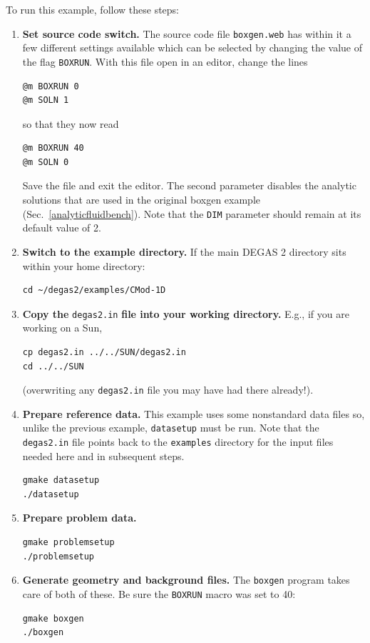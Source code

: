 \documentclass[12pt]{report}
\begin{document}
To run this example, follow these steps:
\begin{enumerate}
  \item {\bf Set source code switch.} The source code file {\tt boxgen.web}
has within it a few different settings available which can be selected
by changing the value of the flag {\tt BOXRUN}. With this file open in
an editor, change the lines
\begin{verbatim}
@m BOXRUN 0
@m SOLN 1
\end{verbatim}
so that they now read
\begin{verbatim}
@m BOXRUN 40
@m SOLN 0
\end{verbatim}
Save the file and exit the editor. The second parameter disables the
analytic solutions that are used in the original boxgen
example (Sec.~\ref{analyticfluidbench}).  Note that the 
\verb+DIM+ parameter should remain at its default value of
2.
  \item {\bf Switch to the example directory.} If the main DEGAS 2 
directory sits within your home directory:
\begin{verbatim}
cd ~/degas2/examples/CMod-1D
\end{verbatim}
  \item {\bf Copy the} {\tt degas2.in} {\bf file into your working
directory.} E.g., if you are working on a Sun, 
\begin{verbatim}
cp degas2.in ../../SUN/degas2.in
cd ../../SUN
\end{verbatim}
(overwriting any {\tt degas2.in} file you may have had there already!).
  \item {\bf Prepare reference data.} This example uses some nonstandard
data files so, unlike the previous example, {\tt datasetup}
must be run. Note that the {\tt degas2.in} file points back to
the {\tt examples} directory for the input files needed here and in 
subsequent steps.
\begin{verbatim}
gmake datasetup
./datasetup
\end{verbatim}
  \item {\bf Prepare problem data.}
\begin{verbatim}
gmake problemsetup
./problemsetup
\end{verbatim}
  \item {\bf Generate geometry and background files.} The {\tt boxgen}
program takes care of both of these. Be sure the \verb+BOXRUN+ macro was
set to 40:
\begin{verbatim}
gmake boxgen
./boxgen
\end{verbatim}

\end{enumerate}
\end{document}
